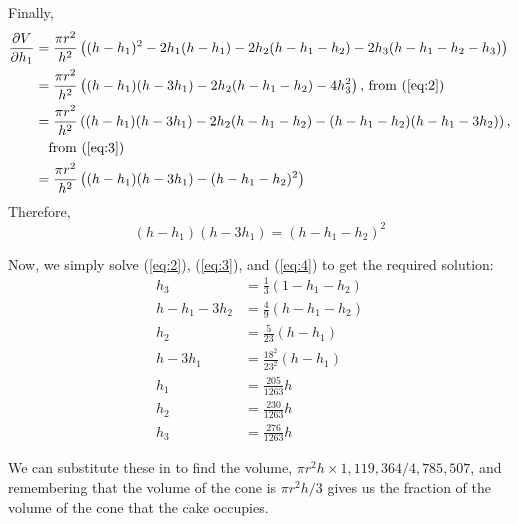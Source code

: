 \documentclass[12pt]{article}
\begin{document}
Finally,
\begin{align*}
  \frac{\partial V}{\partial h_1} &= \frac{\pi r^2}{h^2}\left( (h - h_1)^2 - 2h_1(h-h_1) - 2h_2(h - h_1 - h_2) - 2h_3(h - h_1 - h_2 - h_3) \right)\\
                                  &= \frac{\pi r^2}{h^2} \left( (h-h_1)(h-3h_1) - 2h_2(h-h_1 - h_2) - 4h_3^2 \right)\text{, from (\ref{eq:2})} \\
                                  &= \frac{\pi r^2}{h^2} \left( (h-h_1)(h-3h_1) - 2h_2(h-h_1 - h_2) - (h-h_1-h_2)(h-h_1-3h_2) \right), \\
                                  &\quad \text{from (\ref{eq:3})}\\
  &= \frac{\pi r^2}{h^2}\left( (h-h_1)(h-3h_1) - (h-h_1 - h_2)^2 \right)
\end{align*}
Therefore,
\begin{equation}
  \label{eq:4}
  (h-h_1)(h-3h_1) = (h-h_1 - h_2)^2
\end{equation}

Now, we simply solve (\ref{eq:2}), (\ref{eq:3}), and (\ref{eq:4}) to get the required solution:
\begin{align*}
  h_3 &= \frac{1}{3}(1-h_1-h_2) \\
  h - h_1 - 3h_2 &= \frac{4}{9}(h-h_1-h_2) \\
  h_2 &= \frac{5}{23}(h-h_1)\\
  h - 3h_1 &= \frac{18^2}{23^2} (h-h_1) \\
  h_1 &= \frac{205}{1263}h \\
  h_2 &= \frac{230}{1263}h \\
  h_3 &= \frac{276}{1263}h
\end{align*}

We can substitute these in to find the volume, $\pi r^2 h \times 1,119,364/4,785,507$, and remembering that the volume of the cone is $\pi r^2 h / 3$ gives us the fraction of the volume of the cone that the cake occupies.
\end{document}
